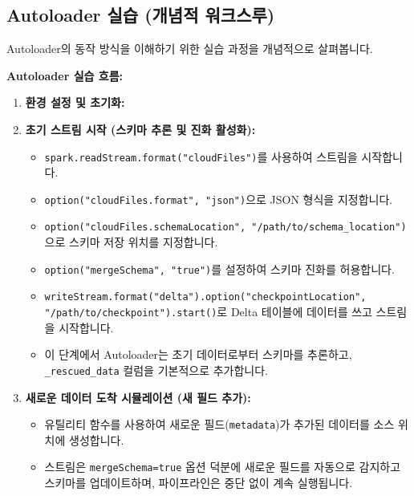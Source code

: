 \documentclass[11pt,a4paper]{article}
\theoremstyle{definition}
\begin{document}
\subsection{Autoloader 실습 (개념적 워크스루)}
Autoloader의 동작 방식을 이해하기 위한 실습 과정을 개념적으로 살펴봅니다.

\begin{examplebox}
\textbf{Autoloader 실습 흐름:}
\begin{enumerate}
    \item \textbf{환경 설정 및 초기화:}
    \item \textbf{초기 스트림 시작 (스키마 추론 및 진화 활성화):}
    \begin{itemize}
        \item \texttt{spark.readStream.format("cloudFiles")}를 사용하여 스트림을 시작합니다.
        \item \texttt{option("cloudFiles.format", "json")}으로 JSON 형식을 지정합니다.
        \item \texttt{option("cloudFiles.schemaLocation", "/path/to/schema_location")}으로 스키마 저장 위치를 지정합니다.
        \item \texttt{option("mergeSchema", "true")}를 설정하여 스키마 진화를 허용합니다.
        \item \texttt{writeStream.format("delta").option("checkpointLocation", "/path/to/checkpoint").start()}로 Delta 테이블에 데이터를 쓰고 스트림을 시작합니다.
        \item 이 단계에서 Autoloader는 초기 데이터로부터 스키마를 추론하고, \texttt{_rescued_data} 컬럼을 기본적으로 추가합니다.
    \end{itemize}
    \item \textbf{새로운 데이터 도착 시뮬레이션 (새 필드 추가):}
    \begin{itemize}
        \item 유틸리티 함수를 사용하여 새로운 필드(\texttt{metadata})가 추가된 데이터를 소스 위치에 생성합니다.
        \item 스트림은 \texttt{mergeSchema=true} 옵션 덕분에 새로운 필드를 자동으로 감지하고 스키마를 업데이트하며, 파이프라인은 중단 없이 계속 실행됩니다.

\end{itemize}
\end{enumerate}
\end{examplebox}
\end{document}
